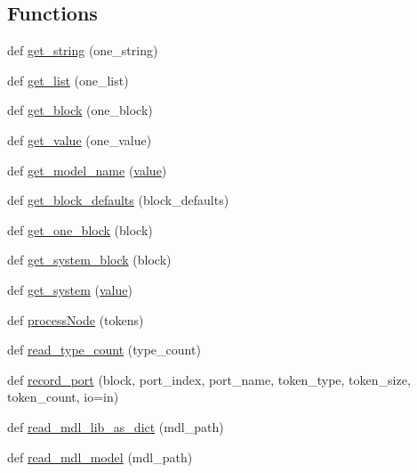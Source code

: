 \subsection*{Functions}
\begin{DoxyCompactItemize}
\item 
def \hyperlink{namespacesylva_1_1frontend_1_1mdl__reader_a242d55779219e76eca1223379ef92cbe}{get\+\_\+string} (one\+\_\+string)
\item 
def \hyperlink{namespacesylva_1_1frontend_1_1mdl__reader_a57fe0f3fd3c042d0b72f2725d8cc4496}{get\+\_\+list} (one\+\_\+list)
\item 
def \hyperlink{namespacesylva_1_1frontend_1_1mdl__reader_ab87bbf99474762b7a54620e20adfddc2}{get\+\_\+block} (one\+\_\+block)
\item 
def \hyperlink{namespacesylva_1_1frontend_1_1mdl__reader_a1109464081a5fe17543fc36a494625bd}{get\+\_\+value} (one\+\_\+value)
\item 
def \hyperlink{namespacesylva_1_1frontend_1_1mdl__reader_a078c8f3a089b8fd85e32051e6cdb1881}{get\+\_\+model\+\_\+name} (\hyperlink{namespacesylva_1_1frontend_1_1mdl__reader_a20dbd52811dc7d7916a801d1b8cc772e}{value})
\item 
def \hyperlink{namespacesylva_1_1frontend_1_1mdl__reader_af44b7256da0388f8bdd76e719520bf8c}{get\+\_\+block\+\_\+defaults} (block\+\_\+defaults)
\item 
def \hyperlink{namespacesylva_1_1frontend_1_1mdl__reader_a64abdaaea51955fecbf3c5557ff78edc}{get\+\_\+one\+\_\+block} (block)
\item 
def \hyperlink{namespacesylva_1_1frontend_1_1mdl__reader_ae055d388934ef992b5b05417b47b2940}{get\+\_\+system\+\_\+block} (block)
\item 
def \hyperlink{namespacesylva_1_1frontend_1_1mdl__reader_a51ec6ceefd4c16f0d3d80edbdc40c0e9}{get\+\_\+system} (\hyperlink{namespacesylva_1_1frontend_1_1mdl__reader_a20dbd52811dc7d7916a801d1b8cc772e}{value})
\item 
def \hyperlink{namespacesylva_1_1frontend_1_1mdl__reader_a7b67abf433ee65dc01be853f378cc616}{process\+Node} (tokens)
\item 
def \hyperlink{namespacesylva_1_1frontend_1_1mdl__reader_ab497eed79d6bd7ce335dafa24e638470}{read\+\_\+type\+\_\+count} (type\+\_\+count)
\item 
def \hyperlink{namespacesylva_1_1frontend_1_1mdl__reader_a5c3d81eb45232a9875a247ce76c4cdc9}{record\+\_\+port} (block, port\+\_\+index, port\+\_\+name, token\+\_\+type, token\+\_\+size, token\+\_\+count, io=\textquotesingle{}in\textquotesingle{})
\item 
def \hyperlink{namespacesylva_1_1frontend_1_1mdl__reader_a98e0329f3a64c7c2d8d9627cf545b130}{read\+\_\+mdl\+\_\+lib\+\_\+as\+\_\+dict} (mdl\+\_\+path)
\item 
def \hyperlink{namespacesylva_1_1frontend_1_1mdl__reader_a49a44158ffdececdbadbd00017774a8c}{read\+\_\+mdl\+\_\+model} (mdl\+\_\+path)
\end{DoxyCompactItemize}
